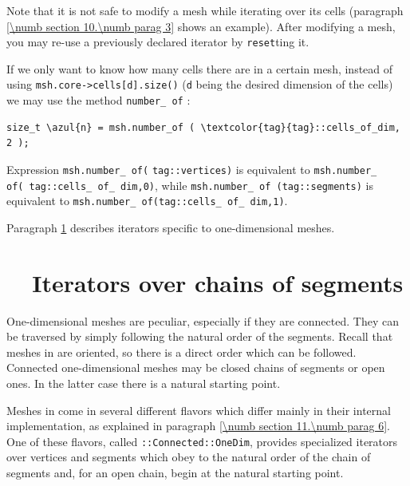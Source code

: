 Note that it is not safe to modify a mesh while iterating over its cells
(paragraph \ref{\numb section 10.\numb parag 3} shows an example).
After modifying a mesh, you may re-use a previously declared iterator by {\small\tt reset}ting it.

If we only want to know how many cells there are in a certain mesh,
instead of using {\small\tt msh.core->cells[d].size()} ({\small\tt d} being the desired
dimension of the cells) we may use the method {\small\tt number\_\,of} :

\begin{Verbatim}[commandchars=\\\{\},formatcom=\small\tt,
   baselinestretch=0.94,framesep=2mm                      ]
   size_t \azul{n} = msh.number_of ( \textcolor{tag}{tag}::cells_of_dim, 2 );
\end{Verbatim}

\noindent Expression {\small\tt msh.number\_\,of}\hskip1pt{\small\tt (}\hskip1pt
{\small\tt \textcolor{tag}{tag}::vertices}\hskip1pt{\small\tt )} is equivalent to
\hbox{{\small\tt msh.number\_\,of}\hskip1pt{\small\tt (}\hskip1pt
{\small\tt \textcolor{tag}{tag}::cells\_\,of\_\,dim,}\hskip1pt{\small\tt 0}\hskip1pt{\small\tt )}},
while {\small\tt msh.number\_\,of}\hskip2pt{\small\tt
(}\hskip2pt{\small\tt \textcolor{tag}{tag}::segments}\hskip2pt{\small\tt )} is equivalent to
{\small\tt msh.number\_\,of}\hskip2pt{\small\tt (}\hskip2pt{\small\tt \textcolor{tag}{tag}::cells\_\,of\_\,dim,}\hskip2pt{\small\tt 1}\hskip2pt{\small\tt )}.

Paragraph \ref{\numb section 9.\numb parag 4} describes iterators specific to one-dimensional
meshes.


\section{~~Iterators over chains of segments}\label{\numb section 9.\numb parag 4}

One-dimensional meshes are peculiar, especially if they are connected.
They can be traversed by simply following the natural order of the segments.
Recall that meshes in {\maniFEM} are oriented, so there is a direct order which can be followed.
Connected one-dimensional meshes may be closed chains of segments or open ones.
In the latter case there is a natural starting point.

Meshes in {\maniFEM} come in several different flavors which differ mainly in their internal
implementation, as explained in paragraph \ref{\numb section 11.\numb parag 6}.
One of these flavors, called {\small\tt {}::Connected::OneDim}, provides specialized iterators
over vertices and segments which obey to the natural order of the chain of segments and,
for an open chain, begin at the natural starting point.

